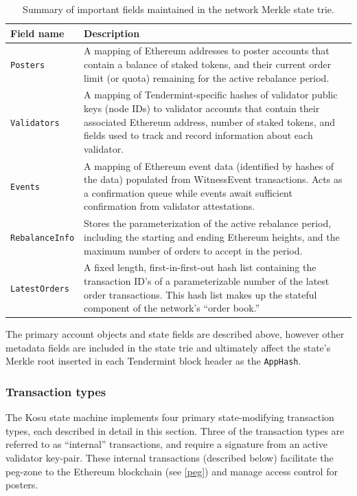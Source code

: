 \documentclass[10pt]{article}
\begin{document}
\bgroup
\def\arraystretch{1.2}
\begin{table}[H]
\centering
\label{table:table3}
\begin{tabularx}{1\textwidth}{|l|X|}
\hline
\textbf{Field name} & \textbf{Description} \\
\hline
\texttt{Posters} & A mapping of Ethereum addresses to poster accounts that contain a balance of staked tokens, and their current order limit (or quota) remaining for the active rebalance period. \\
\hline
\texttt{Validators} & A mapping of Tendermint-specific hashes of validator public keys (node IDs) to validator accounts that contain their associated Ethereum address, number of staked tokens, and fields used to track and record information about each validator. \\
\hline
\texttt{Events} & A mapping of Ethereum event data (identified by hashes of the data) populated from WitnessEvent transactions. Acts as a confirmation queue while events await sufficient confirmation from validator attestations. \\
\hline
\texttt{RebalanceInfo} & Stores the parameterization of the active rebalance period, including the starting and ending Ethereum heights, and the maximum number of orders to accept in the period. \\
\hline
\texttt{LatestOrders} & A fixed length, first-in-first-out hash list containing the transaction ID’s of a parameterizable number of the latest order transactions. This hash list makes up the stateful component of the network’s ``order book.'' \\
\hline
\end{tabularx}
\caption{Summary of important fields maintained in the network Merkle state trie.} 
\end{table}
\egroup

The primary account objects and state fields are described above, however other metadata fields are included in the state trie and ultimately affect the state’s Merkle root inserted in each Tendermint block header as the \texttt{AppHash}.
\subsubsection{Transaction types}\label{tm-network-tx-types}
The Kosu state machine implements four primary state-modifying transaction types, each described in detail in this section. Three of the transaction types are referred to as ``internal'' transactions, and require a signature from an active validator key-pair. These internal transactions (described below) facilitate the peg-zone to the Ethereum blockchain (see \ref{peg}) and manage access control for posters. 
\medskip
\end{document}
